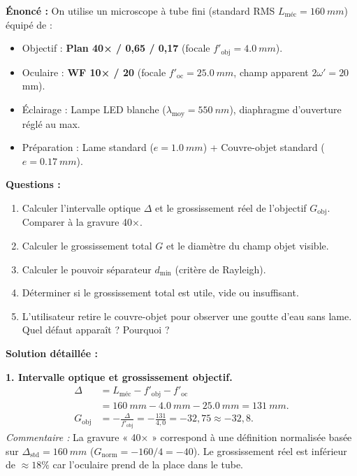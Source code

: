 \documentclass[11pt]{article}
\begin{document}
\begin{exoresolu}
\textbf{Énoncé :} On utilise un microscope à tube fini (standard RMS $L_{\text{méc}} = \SI{160}{mm}$) équipé de :
\begin{itemize}
    \item Objectif : \textbf{Plan 40× / 0,65 / 0,17} (focale $f'_{\text{obj}} = \SI{4,0}{mm}$).
    \item Oculaire : \textbf{WF 10× / 20} (focale $f'_{\text{oc}} = \SI{25,0}{mm}$, champ apparent $2\omega' = 20$ mm).
    \item Éclairage : Lampe LED blanche ($\lambda_{\text{moy}} = \SI{550}{nm}$), diaphragme d'ouverture réglé au max.
    \item Préparation : Lame standard ($e = \SI{1,0}{mm}$) + Couvre-objet standard ($e = \SI{0,17}{mm}$).
\end{itemize}
\textbf{Questions :}
\begin{enumerate}
    \item Calculer l'intervalle optique $\Delta$ et le grossissement réel de l'objectif $G_{\text{obj}}$. Comparer à la gravure 40×.
    \item Calculer le grossissement total $G$ et le diamètre du champ objet visible.
    \item Calculer le pouvoir séparateur $d_{\text{min}}$ (critère de Rayleigh).
    \item Déterminer si le grossissement total est utile, vide ou insuffisant.
    \item L'utilisateur retire le couvre-objet pour observer une goutte d'eau sans lame. Quel défaut apparaît ? Pourquoi ?
\end{enumerate}

\tcblower
\textbf{Solution détaillée :}

\textbf{1. Intervalle optique et grossissement objectif.}
\begin{align*}
\Delta &= L_{\text{méc}} - f'_{\text{obj}} - f'_{\text{oc}} \\
       &= \SI{160}{mm} - \SI{4,0}{mm} - \SI{25,0}{mm} = \SI{131}{mm}. \\
G_{\text{obj}} &= -\frac{\Delta}{f'_{\text{obj}}} = -\frac{131}{4,0} = -32,75 \approx -32,8.
\end{align*}
\textit{Commentaire :} La gravure « 40× » correspond à une définition normalisée basée sur $\Delta_{\text{std}} = \SI{160}{mm}$ ($G_{\text{norm}} = -160/4 = -40$). Le grossissement réel est inférieur de $\approx 18\%$ car l'oculaire prend de la place dans le tube.


\end{exoresolu}
\end{document}
